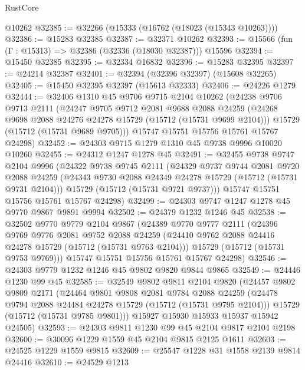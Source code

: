 \begin{lexlean}{RustCore}
\begin{coremodule}
    @10262
@32385 := @32266 (@15333 (@16762 (@18023 (@15343 @10263))))
@32386 := @15283 @32385
@32387 := @32371 @10262
@32393 := @15566 (fun (Γ : @15313) => @32386 (@32336 (@18030 @32387))) @15596
@32394 := @15450 @32385
@32395 := @32334 @16832
@32396 := @15283 @32395
@32397 := @24214 @32387
@32401 := @32394 (@32396 @32397) (@15608 @32265)
@32405 := @15450 @32395 @32397 (@15613 @32333)
@32406 := @24226 @1279
@32444 := @32406
    @1310
    @45
    @9706
    @9715
    @2104
    @10262
    (@24238
      @9706
      @9713
      @2111
      (@24247
        @9705
        @9712
        @2081
        @9688
        @2088
        @24259
        (@24268 @9698 @2088 @24276 @24278 @15729 (@15712 (@15731 @9699 @2104)))
        @15729
        (@15712 (@15731 @9689 @9705)))
      @15747
      @15751
      @15756
      @15761
      @15767
      @24298)
@32452 := @24303 @9715 @1279 @1310 @45 @9738 @9996 @10020 @10260
@32455 := @24312 @1247 @1278 @45
@32491 := @32455
    @9738
    @9747
    @2104
    @9996
    (@24322
      @9738
      @9745
      @2111
      (@24329
        @9737
        @9744
        @2081
        @9720
        @2088
        @24259
        (@24343 @9730 @2088 @24349 @24278 @15729 (@15712 (@15731 @9731 @2104)))
        @15729
        (@15712 (@15731 @9721 @9737)))
      @15747
      @15751
      @15756
      @15761
      @15767
      @24298)
@32499 := @24303 @9747 @1247 @1278 @45 @9770 @9867 @9891 @9994
@32502 := @24379 @1232 @1246 @45
@32538 := @32502
    @9770
    @9779
    @2104
    @9867
    (@24389
      @9770
      @9777
      @2111
      (@24396
        @9769
        @9776
        @2081
        @9752
        @2088
        @24259
        (@24410 @9762 @2088 @24416 @24278 @15729 (@15712 (@15731 @9763 @2104)))
        @15729
        (@15712 (@15731 @9753 @9769)))
      @15747
      @15751
      @15756
      @15761
      @15767
      @24298)
@32546 := @24303 @9779 @1232 @1246 @45 @9802 @9820 @9844 @9865
@32549 := @24446 @1230 @99 @45
@32585 := @32549
    @9802
    @9811
    @2104
    @9820
    (@24457
      @9802
      @9809
      @2171
      (@24464
        @9801
        @9808
        @2081
        @9784
        @2088
        @24259
        (@24478 @9794 @2088 @24484 @24278 @15729 (@15712 (@15731 @9795 @2104)))
        @15729
        (@15712 (@15731 @9785 @9801)))
      @15927
      @15930
      @15933
      @15937
      @15942
      @24505)
@32593 := @24303 @9811 @1230 @99 @45 @2104 @9817 @2104 @2198
@32600 := @30096 @1229 @1559 @45 @2104 @9815 @2125 @1611
@32603 := @24525 @1229 @1559 @9815
@32609 := @25547 @1228 @31 @1558 @2139 @9814 @24416
@32610 := @24529 @1213

\end{coremodule}
\end{lexlean}
